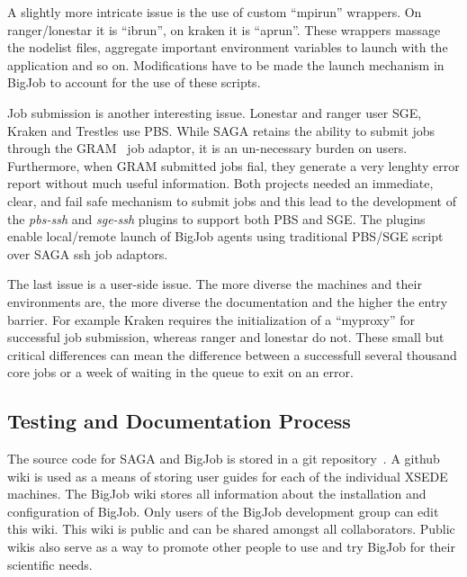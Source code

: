 \documentclass{sig-alternate}
\begin{document}
A slightly more intricate issue is the use of custom ``mpirun'' wrappers. On
ranger/lonestar it is ``ibrun'', on kraken it is ``aprun''. These wrappers
massage the nodelist files, aggregate important environment variables to launch
with the application and so on. Modifications have to be made the launch
mechanism in BigJob to account for the use of these scripts.

Job submission is another interesting issue. Lonestar and ranger user SGE,
Kraken and Trestles use PBS. While SAGA retains the ability to submit jobs
through the GRAM~\cite{gram} job adaptor, it is an un-necessary burden on
users. Furthermore, when GRAM submitted jobs fial, they generate a very lenghty
error report without much useful information. Both projects needed an
immediate, clear, and fail safe mechanism to submit jobs and this lead to the
development of the \textit{pbs-ssh} and \textit{sge-ssh} plugins to support
both PBS and SGE. The plugins enable local/remote launch of BigJob agents using
traditional PBS/SGE script over SAGA ssh job adaptors.

The last issue is a user-side issue. The more diverse the machines and their
environments are, the more diverse the documentation and the higher the entry
barrier. For example Kraken requires the initialization of a ``myproxy'' for
successful job submission, whereas ranger and lonestar do not. These small  but
critical differences can mean the difference between a successfull several
thousand core jobs or a week of waiting in the queue to exit on an error.


\subsection{Testing and Documentation Process}

The source code for SAGA and BigJob is stored in a git repository~. A github wiki is used as a means of storing
user guides for each of the individual XSEDE machines. The BigJob wiki stores
all information about the installation and configuration of BigJob. Only users
of the BigJob development group can edit this wiki. This wiki is public and can
be shared amongst all collaborators. Public wikis also serve as a way to promote
other people to use and try BigJob for their scientific needs.
\end{document}

